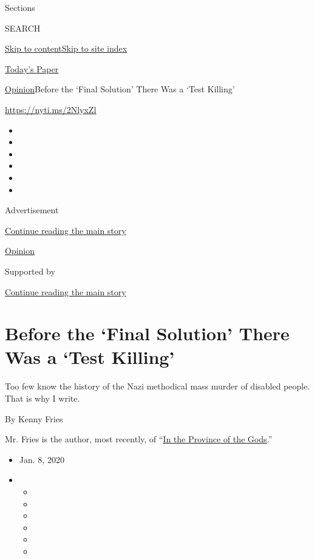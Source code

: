 Sections

SEARCH

\protect\hyperlink{site-content}{Skip to
content}\protect\hyperlink{site-index}{Skip to site index}

\href{https://myaccount.nytimes3xbfgragh.onion/auth/login?response_type=cookie\&client_id=vi}{}

\href{https://www.nytimes3xbfgragh.onion/section/todayspaper}{Today's
Paper}

\href{/section/opinion}{Opinion}\textbar{}Before the `Final Solution'
There Was a `Test Killing'

\url{https://nyti.ms/2NlyxZl}

\begin{itemize}
\item
\item
\item
\item
\item
\item
\end{itemize}

Advertisement

\protect\hyperlink{after-top}{Continue reading the main story}

\href{/section/opinion}{Opinion}

Supported by

\protect\hyperlink{after-sponsor}{Continue reading the main story}

\hypertarget{before-the-final-solution-there-was-a-test-killing}{%
\section{Before the `Final Solution' There Was a `Test
Killing'}\label{before-the-final-solution-there-was-a-test-killing}}

Too few know the history of the Nazi methodical mass murder of disabled
people. That is why I write.

By Kenny Fries

Mr. Fries is the author, most recently, of
``\href{https://uwpress.wisc.edu/books/5638.htm}{In the Province of the
Gods}.''

\begin{itemize}
\item
  Jan. 8, 2020
\item
  \begin{itemize}
  \item
  \item
  \item
  \item
  \item
  \item
  \end{itemize}
\end{itemize}

